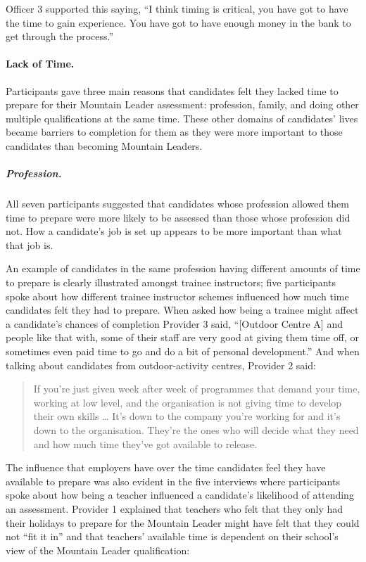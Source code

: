 \documentclass[
  12pt,
  a4paper,
]{book}
\begin{document}
Officer 3 supported this saying, ``I think timing is critical, you have got to have the time to gain experience. You have got to have enough money in the bank to get through the process.''

\hypertarget{qual-gta-lack-of-time}{%
\paragraph{Lack of Time.}\label{qual-gta-lack-of-time}}

Participants gave three main reasons that candidates felt they lacked time to prepare for their Mountain Leader assessment: profession, family, and doing other multiple qualifications at the same time. These other domains of candidates' lives became barriers to completion for them as they were more important to those candidates than becoming Mountain Leaders.

\hypertarget{profession.}{%
\subparagraph{Profession.}\label{profession.}}

All seven participants suggested that candidates whose profession allowed them time to prepare were more likely to be assessed than those whose profession did not. How a candidate's job is set up appears to be more important than what that job is.

An example of candidates in the same profession having different amounts of time to prepare is clearly illustrated amongst trainee instructors; five participants spoke about how different trainee instructor schemes influenced how much time candidates felt they had to prepare. When asked how being a trainee might affect a candidate's chances of completion Provider 3 said, ``{[}Outdoor Centre A{]} and people like that with, some of their staff are very good at giving them time off, or sometimes even paid time to go and do a bit of personal development.'' And when talking about candidates from outdoor-activity centres, Provider 2 said:

\begin{quote}
If you're just given week after week of programmes that demand your time, working at low level, and the organisation is not giving time to develop their own skills \ldots{} It's down to the company you're working for and it's down to the organisation. They're the ones who will decide what they need and how much time they've got available to release.
\end{quote}

The influence that employers have over the time candidates feel they have available to prepare was also evident in the five interviews where participants spoke about how being a teacher influenced a candidate's likelihood of attending an assessment. Provider 1 explained that teachers who felt that they only had their holidays to prepare for the Mountain Leader might have felt that they could not ``fit it in'' and that teachers' available time is dependent on their school's view of the Mountain Leader qualification:
\end{document}
